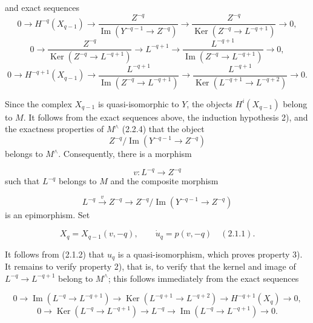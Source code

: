 \clearpage
{}%
\begingroup\small\setlength{\parskip}{0pt}\setlength{\emergencystretch}{1.5em}
\setlength{\abovedisplayskip}{4pt plus 2pt minus 2pt}%
\setlength{\belowdisplayskip}{4pt plus 2pt minus 2pt}%

and exact sequences
\[
0\longrightarrow H^{-q}(X_{q-1})\longrightarrow
\frac{Z^{-q}}{\operatorname{Im}(Y^{-q-1}\longrightarrow Z^{-q})}
\longrightarrow
\frac{Z^{-q}}{\operatorname{Ker}(Z^{-q}\longrightarrow L^{-q+1})}
\longrightarrow0,
\]
\[
0\longrightarrow
\frac{Z^{-q}}{\operatorname{Ker}(Z^{-q}\longrightarrow L^{-q+1})}
\longrightarrow L^{-q+1}\longrightarrow
\frac{L^{-q+1}}{\operatorname{Im}(Z^{-q}\longrightarrow L^{-q+1})}
\longrightarrow0,
\]
\[
0\longrightarrow H^{-q+1}(X_{q-1})\longrightarrow
\frac{L^{-q+1}}{\operatorname{Im}(Z^{-q}\longrightarrow L^{-q+1})}
\longrightarrow
\frac{L^{-q+1}}{\operatorname{Ker}(L^{-q+1}\longrightarrow L^{-q+2})}
\longrightarrow0.
\]

Since the complex $X_{q-1}$ is quasi-isomorphic to $Y$, the objects
$H^i(X_{q-1})$ belong to $M$. It follows from the exact sequences above,
the induction hypothesis 2), and the exactness properties of $M^\wedge$
(2.2.4) that the object
\[
Z^{-q}/\operatorname{Im}(Y^{-q-1}\longrightarrow Z^{-q})
\]
belongs to $M^\wedge$. Consequently, there is a morphism

\[
v\colon L^{-q}\longrightarrow Z^{-q}
\]
such that $L^{-q}$ belongs to $M$ and the composite morphism

\[
L^{-q}\xrightarrow{v}Z^{-q}\longrightarrow
Z^{-q}/\operatorname{Im}(Y^{-q-1}\longrightarrow Z^{-q})
\]
is an epimorphism. Set

\[
X_q=X_{q-1}(v,-q),
\qquad
\dot u_q=p(v,-q)\quad(2.1.1).
\]

It follows from (2.1.2) that $u_q$ is a quasi-isomorphism, which proves
property 3). It remains to verify property 2), that is, to verify that the
kernel and image of $L^{-q}\longrightarrow L^{-q+1}$ belong to $M^\wedge$;
this follows immediately from the exact sequences

\[
0\longrightarrow\operatorname{Im}(L^{-q}\longrightarrow L^{-q+1})
\longrightarrow\operatorname{Ker}(L^{-q+1}\longrightarrow L^{-q+2})
\longrightarrow H^{-q+1}(X_q)\longrightarrow0,
\]
\[
0\longrightarrow\operatorname{Ker}(L^{-q}\longrightarrow L^{-q+1})
\longrightarrow L^{-q}\longrightarrow
\operatorname{Im}(L^{-q}\longrightarrow L^{-q+1})\longrightarrow0.
\]

